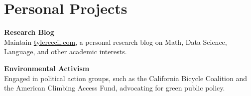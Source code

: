 \documentclass{tc_cv}
\begin{document}
\begin{minipage}[t]{0.3\linewidth}
  \vspace{1.5em}
  \section{Personal Projects}
  \textbf{Research Blog}\\
  Maintain \href{https://tylercecil.com}{\ul{tylercecil.com}}, a personal
  research blog on Math, Data Science, Language, and other academic interests.

  \vspace{0.5em}
  \textbf{Environmental Activism}\\
  Engaged in political action groups, such as the California Bicycle Coalition
  and the American Climbing Access Fund, advocating for green public policy.


\end{minipage}
\hfill\vline\hfill
\end{document}
